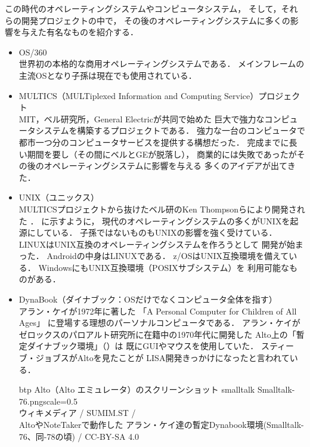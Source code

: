 この時代のオペレーティングシステムやコンピュータシステム，
そして，それらの開発プロジェクトの中で，
その後のオペレーティングシステムに多くの影響を与えた有名なものを紹介する．

\begin{itemize}
\item OS/360 \\
世界初の本格的な商用オペレーティングシステムである．
メインフレームの主流OSとなり子孫は現在でも使用されている\cite{os360}．

\item MULTICS（MULTiplexed Information and Computing Service）プロジェクト
\cite{third} \\
MIT，ベル研究所，General Electricが共同で始めた
巨大で強力なコンピュータシステムを構築するプロジェクトである．
強力な一台のコンピュータで
都市一つ分のコンピュータサービスを提供する構想だった．
完成までに長い期間を要し（その間にベルとGEが脱落し），
商業的には失敗であったがその後のオペレーティングシステムに影響を与える
多くのアイデアが出てきた．

\item UNIX（ユニックス） \\
MULTICSプロジェクトから抜けたベル研のKen Thompsonらにより開発された
\cite{unix}．
に示すように，
現代のオペレーティングシステムの多くがUNIXを起源にしている．
子孫ではないものもUNIXの影響を強く受けている．
LINUXはUNIX互換のオペレーティングシステムを作ろうとして
開発が始まった\cite{linux}．
Androidの中身はLINUXである\cite{android}．
z/OSはUNIX互換環境を備えている\cite{zos}．
WindowsにもUNIX互換環境（POSIXサブシステム）を
利用可能なものがある\cite{windows}．

\item DynaBook（ダイナブック：OSだけでなくコンピュータ全体を指す）
\cite{dynabook2} \\
アラン・ケイが1972年に著した
「A Personal Computer for Children of All Ages」\cite{key72, key72J}
に登場する理想のパーソナルコンピュータである．
アラン・ケイがゼロックスのパロアルト研究所に在籍中の1970年代に開発した
Alto上の「暫定ダイナブック環境」（）は
既にGUIやマウスを使用していた．
スティーブ・ジョブスがAltoを見たことが
LISA開発きっかけになったと言われている\cite{dynabook}．

\begin{myfig}{btp}
{Alto（Alto エミュレータ）のスクリーンショット}
{smalltalk}
\myincludegraphics
{Smalltalk-76.png}{scale=0.5}\\
{\small
ウィキメディア /
SUMIM.ST /\\
AltoやNoteTakerで動作した
アラン・ケイ達の暫定Dynabook環境(Smalltalk-76、同-78の頃) /
CC-BY-SA 4.0
}
\end{myfig}

\end{itemize}


